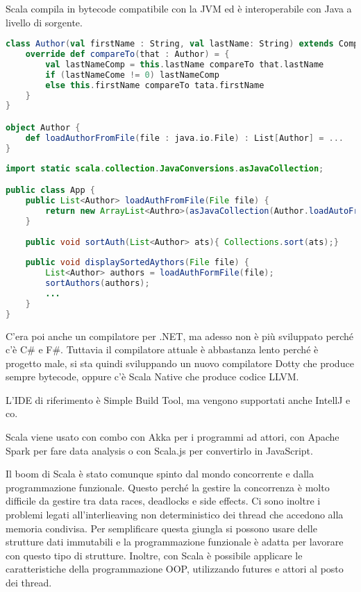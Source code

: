 Scala compila in bytecode compatibile con la JVM ed è interoperabile con Java a livello di sorgente.

\begin{lstlisting}[language=Scala, caption=\texttt{Author.scala}: Utizzo di Java all'interno di Scala. Da notare che i generics vengono specificati con le parentesi quadre al posto di quelle angolate. Le chiamate di metodi possono anche essere fatte con la notazione infissa.]
class Author(val firstName : String, val lastName: String) extends Comparable[Author] {
	override def compareTo(that : Author) = {
		val lastNameComp = this.lastName compareTo that.lastName
		if (lastNameCome != 0) lastNameComp
		else this.firstName compareTo tata.firstName
	}
}

object Author {
	def loadAuthorFromFile(file : java.io.File) : List[Author] = ...
}
\end{lstlisting}

\begin{lstlisting}[language=Java, caption=\texttt{App.java} utilizzo di Scala all'interno di Java.]
import static scala.collection.JavaConversions.asJavaCollection;

public class App {
	public List<Author> loadAuthFromFile(File file) {
		return new ArrayList<Authro>(asJavaCollection(Author.loadAutoFromFile(file)));
	}
	
	public void sortAuth(List<Author> ats){ Collections.sort(ats);}
	
	public void displaySortedAythors(File file) {
		List<Author> authors = loadAuthFormFile(file);
		sortAuthors(authors);
		...
	}
}
\end{lstlisting}

C'era poi anche un compilatore per .NET, ma adesso non è più sviluppato perché c'è C\# e F\#.
Tuttavia il compilatore attuale è abbastanza lento perché è progetto male, si sta quindi sviluppando un nuovo compilatore Dotty che produce sempre bytecode, oppure c'è Scala Native che produce codice LLVM.

L'IDE di riferimento è Simple Build Tool, ma vengono supportati anche IntellJ e co.

Scala viene usato con combo con Akka per i programmi ad attori, con Apache Spark per fare data analysis o con Scala.js per convertirlo in JavaScript.

Il boom di Scala è stato comunque spinto dal mondo concorrente e dalla programmazione funzionale. Questo perché la gestire la concorrenza è molto difficile da gestire tra data races, deadlocks e side effects. Ci sono inoltre i problemi legati all'interlieaving non deterministico dei thread che accedono alla memoria condivisa.
Per semplificare questa giungla si possono usare delle strutture dati immutabili e la programmazione funzionale è adatta per lavorare con questo tipo di strutture.
Inoltre, con Scala è possibile applicare le caratteristiche della programmazione OOP, utilizzando futures e attori al posto dei thread.


